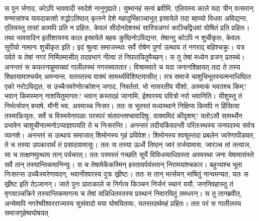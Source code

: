 \vakya स पुन र्जगाद, कोऽपि भाववादी स्वदेशे नानुगृह्यते।
\vakya युष्मानहं सत्यं ब्रवीमि, एलियस्य काले यदा त्रीन् वत्सरान् षण्मासांश्च यावदाकाशो रुद्धोऽतिष्ठत् कृत्स्ने देशे महादुर्भिक्षञ्चाभूत् इस्रायेले तदा बह्व्यो विधवा अविद्यन्त, एलियस्तु तासां कामपि प्रति न प्रहितः,
\vakya केवलं सीदोनदेशस्थं सारिफन्नगरं काञ्चिद्विधवां योषितं प्रति प्रहितः।
\vakya तथा भाववादिन इलीशायस्य काल इस्रायेले बहवः कुष्ठिनोऽविद्यन्त, तेषान्तु कोऽपि न शुचीकृतः, केवलः सुरीयो नामानः शुचीकृत इति।
\vakya इदं श्रुत्वा समाजस्थाः सर्वे रोषेण पुर्णा उत्थाय तं नगराद् बहिश्चक्रुः।
\vakya यत्र पर्वते च तेषां नगरं निर्मितमासीत् तदग्रभागं नीत्वा तं निपातयितुमैच्छन्।
\vakya स तु तेषां मध्येन व्रजन् प्रतस्थे।
\vakya अनन्तरं स कफरनाहूमाख्यां गालीलस्थं नगरमवततार।
\vakya विश्रामवारे च यदा जनानशिक्षयत् तदा ते तस्य शिक्षायामाश्चर्यम् अमन्यन्त, यतस्तस्य वाक्यं सामर्थ्यविशिष्टमासीत्।
\vakya तत्र समाजे चाशुचिभूतस्यत्मनाधिष्ठित एको नरोऽविद्यत, स उच्चैःस्वरेणोत्क्रोशन् जगाद,
\vakya निवर्ततां, भो नासरतीय यीशो, अस्माकं भवतश्च किम्? भवान् किमस्मान् नाशयितुमागतः? भवान् कस्तदहं जानामि, ईश्वरस्य पवित्रो नरो भवानिति।
\vakya यीशुस्तु तं निर्भर्त्सयन् बभाषे, मौनी भव, अस्माच्च निःसर। ततः स भूतस्तं मध्यस्थाने निक्षिप्य किमपि न हिंसित्वा तस्मान्निःसृतः,
\vakya सर्वे च विस्मयेनापन्नाः परस्परं संलपन्तश्चावादिषुः, वाक्यमिदं कीदृशम्? यतोऽसौ सामर्थ्येन प्रभावेन चाशुचीनात्मनोऽप्याज्ञापयति ते च निःसरन्ति।
\vakya अनन्तरं तदीयकिंवदन्ती परितःस्थस्य जनपदस्य सर्वत्र व्यानशे।
\vakya अनन्तरं स उत्थाय समाजात् शिमोनस्य गृहं प्रविवेश। शिमोनस्य श्वश्रूस्तदा प्रबलेन ज्वरेणापीड्यत, ते च तस्या उपकारार्थं तं प्रसादयामासुः।
\vakya ततः स तस्या ऊर्ध्वे तिष्ठन् ज्वरं तर्जयामास, ज्वरञ्च तां तत्याज, सा च तत्क्षणमुत्थाय तान् पर्यचरत्।
\vakya ततः परमस्तं गच्छति सूर्ये विविधव्याधिग्रस्ता अस्वस्था जना येषामासंस्ते सर्वे तान् तस्यान्तिकमानिन्युः। स च तेषामेकैकस्मिन् हस्तावर्पयंस्तान् निरामयांश्चकार।
\vakya बहुभ्यश्च भूता निःसरन्त उच्चैःस्वरेणावदन्, भवानीश्वरस्य पुत्रः ख्रीष्टः। ततः स तान् भर्त्सयन् भाषितुं नान्वमन्यत, यतः स ख्रीष्ट इति तेऽजानन्।
\vakya जाते पुनः प्रातःकाले स निर्गत्य किञ्चन निर्जनं स्थानं ययौ, जननिवहास्तु तं मृगयाञ्चक्रिरे तस्यान्तिकमागत्य च तेषां सन्निधितस्तस्य प्रस्थानं निवारयितुं तमधरन्।
\vakya स तु तानब्रवीत्, अन्येष्वपि नगरेष्वीश्वरराज्यस्य सुसंवादो मया घोषयितव्यः, यतस्तदर्थमहं प्रहितः।
\vakya ततः परं स गालीलस्य समाजगृहेष्वघोषयत्\eoc